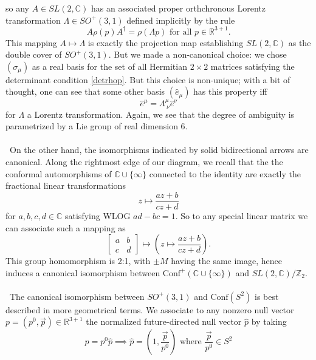 \documentclass[11pt,letterpaper]{article}
\newcommand{\LP}{\left(}
\newcommand{\RP}{\right)}
\newcommand{\R}{\mathbb{R}}
\newcommand{\C}{\mathbb{C}}
\newcommand{\Z}{\mathbb{Z}}
\begin{document}
so any $A \in SL(2,\C)$ has an associated proper orthchronous Lorentz transformation $\Lambda \in SO^+(3,1)$ defined implicitly by the rule \begin{equation}
A \rho(p) A^\dagger = \rho(\Lambda p) \mbox{ for all } p \in \R^{3+1}.
\end{equation}
This mapping $A \mapsto \Lambda$ is exactly the projection map establishing $SL(2,\C)$ as the double cover of $SO^+(3,1)$. But we made a non-canonical choice: we chose $ \LP \sigma_\mu \RP$ as a real basis for the set of all Hermitian $2 \times 2$ matrices satisfying the determinant condition \eqref{detrhop}. But this choice is non-unique; with a bit of thought, one can see that some other basis $\LP \hat{e}_\mu \RP$ has this property iff \begin{equation}
\hat{e}^\mu = \Lambda^\mu _{ \ \nu} \hat{e}^\nu
\end{equation}
for $\Lambda$ a Lorentz transformation. Again, we see that the degree of ambiguity is parametrized by a Lie group of real dimension 6.\\
\\
\
On the other hand, the isomorphisms indicated by solid bidirectional arrows are canonical. Along the rightmost edge of our diagram, we recall that the the conformal automorphisms of $\C \cup \{\infty\}$ connected to the identity are exactly the fractional linear transformations \begin{equation}
z \mapsto \frac{az + b}{c z + d}
\end{equation}
for $a, b, c, d \in \C$ satisfying WLOG $ad - bc = 1$. So to any special linear matrix we can associate such a mapping as \begin{equation}
\begin{bmatrix}
a & b \\ c & d
\end{bmatrix} \mapsto \LP z \mapsto \frac{az + b}{c z + d} \RP.
\end{equation}
This group homomorphism is 2:1, with $\pm M$ having the same image, hence induces a canonical isomorphism between $\mbox{Conf}^+(\C \cup \{\infty\})$ and $SL(2,\C) / \Z_2$.\\
\\
\
The canonical isomorphism between $SO^+(3,1)$ and $\mbox{Conf}(S^2)$ is best described in more geometrical terms. We associate to any nonzero null vector $p = (p^0, \vec{p}) \in \R^{3+1}$ the normalized future-directed null vector $\hat{p}$ by taking \begin{equation}
p = p^0 \hat{p} \implies \hat{p} = \LP 1, \frac{\vec{p}}{p^0} \RP \mbox{ where } \frac{\vec{p}}{p^0} \in S^2
\end{equation}
\end{document}
